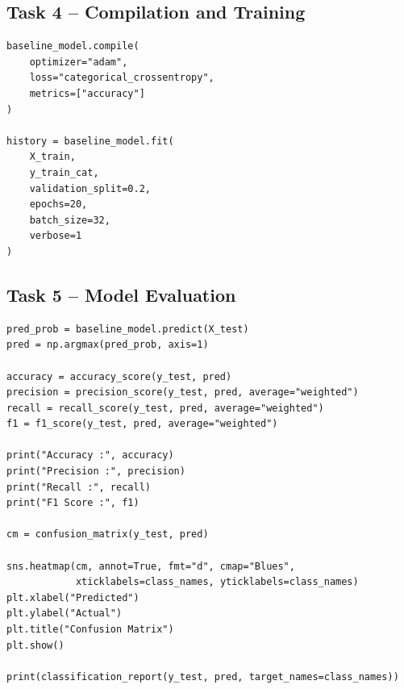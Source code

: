 \documentclass[11pt]{article}
\begin{document}
\subsection{Task 4 -- Compilation and Training}
\begin{lstlisting}
baseline_model.compile(
    optimizer="adam",
    loss="categorical_crossentropy",
    metrics=["accuracy"]
)

history = baseline_model.fit(
    X_train,
    y_train_cat,
    validation_split=0.2,
    epochs=20,
    batch_size=32,
    verbose=1
)
\end{lstlisting}

\subsection{Task 5 -- Model Evaluation}
\begin{lstlisting}
pred_prob = baseline_model.predict(X_test)
pred = np.argmax(pred_prob, axis=1)

accuracy = accuracy_score(y_test, pred)
precision = precision_score(y_test, pred, average="weighted")
recall = recall_score(y_test, pred, average="weighted")
f1 = f1_score(y_test, pred, average="weighted")

print("Accuracy :", accuracy)
print("Precision :", precision)
print("Recall :", recall)
print("F1 Score :", f1)

cm = confusion_matrix(y_test, pred)

sns.heatmap(cm, annot=True, fmt="d", cmap="Blues",
            xticklabels=class_names, yticklabels=class_names)
plt.xlabel("Predicted")
plt.ylabel("Actual")
plt.title("Confusion Matrix")
plt.show()

print(classification_report(y_test, pred, target_names=class_names))
\end{lstlisting}
\end{document}
